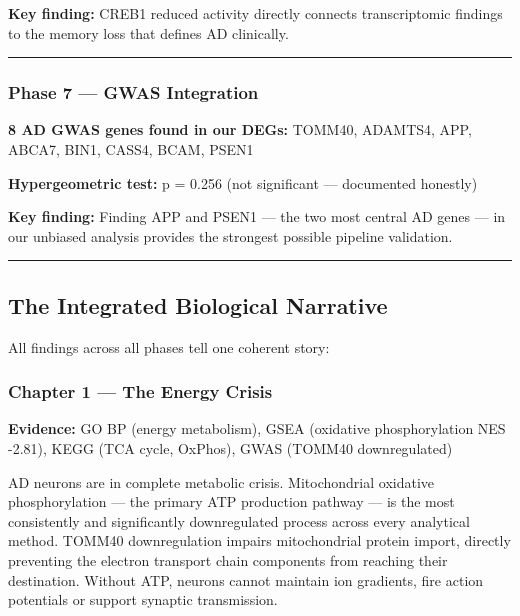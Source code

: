 \documentclass[
]{article}
\begin{document}
\textbf{Key finding:} CREB1 reduced activity directly connects
transcriptomic findings to the memory loss that defines AD clinically.

\begin{center}\rule{0.5\linewidth}{0.5pt}\end{center}

\subsubsection{Phase 7 --- GWAS
Integration}\label{phase-7-gwas-integration-1}

\textbf{8 AD GWAS genes found in our DEGs:} TOMM40, ADAMTS4, APP, ABCA7,
BIN1, CASS4, BCAM, PSEN1

\textbf{Hypergeometric test:} p = 0.256 (not significant --- documented
honestly)

\textbf{Key finding:} Finding APP and PSEN1 --- the two most central AD
genes --- in our unbiased analysis provides the strongest possible
pipeline validation.

\begin{center}\rule{0.5\linewidth}{0.5pt}\end{center}

\subsection{The Integrated Biological
Narrative}\label{the-integrated-biological-narrative}

All findings across all phases tell one coherent story:

\subsubsection{Chapter 1 --- The Energy
Crisis}\label{chapter-1-the-energy-crisis}

\textbf{Evidence:} GO BP (energy metabolism), GSEA (oxidative
phosphorylation NES -2.81), KEGG (TCA cycle, OxPhos), GWAS (TOMM40
downregulated)

AD neurons are in complete metabolic crisis. Mitochondrial oxidative
phosphorylation --- the primary ATP production pathway --- is the most
consistently and significantly downregulated process across every
analytical method. TOMM40 downregulation impairs mitochondrial protein
import, directly preventing the electron transport chain components from
reaching their destination. Without ATP, neurons cannot maintain ion
gradients, fire action potentials or support synaptic transmission.
\end{document}
